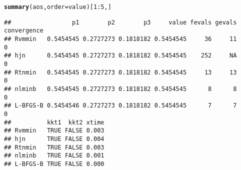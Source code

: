 \documentclass[11pt]{article}\usepackage[]{graphicx}\usepackage[]{color}
\makeatletter
\newcommand{\hlnum}[1]{\textcolor[rgb]{0.686,0.059,0.569}{#1}}%
\newcommand{\hlopt}[1]{\textcolor[rgb]{0,0,0}{#1}}%
\newcommand{\hlstd}[1]{\textcolor[rgb]{0.345,0.345,0.345}{#1}}%
\newcommand{\hlkwc}[1]{\textcolor[rgb]{0.333,0.667,0.333}{#1}}%
\newcommand{\hlkwd}[1]{\textcolor[rgb]{0.737,0.353,0.396}{\textbf{#1}}}%
\newenvironment{kframe}{%
 \def\at@end@of@kframe{}%
 \ifinner\ifhmode%
  \def\at@end@of@kframe{\end{minipage}}%
  \begin{minipage}{\columnwidth}%
 \fi\fi%
 \def\FrameCommand##1{\hskip\@totalleftmargin \hskip-\fboxsep
 \colorbox{shadecolor}{##1}\hskip-\fboxsep
     \hskip-\linewidth \hskip-\@totalleftmargin \hskip\columnwidth}%
 \MakeFramed {\advance\hsize-\width
   \@totalleftmargin\z@ \linewidth\hsize
   \@setminipage}}%
 {\par\unskip\endMakeFramed%
 \at@end@of@kframe}
\newenvironment{knitrout}{}{} %
\makeatother
\begin{document}
\begin{knitrout}
\begin{kframe}
\begin{alltt}
\hlkwd{summary}\hlstd{(aos,}\hlkwc{order}\hlstd{=value)[}\hlnum{1}\hlopt{:}\hlnum{5}\hlstd{,]}
\end{alltt}
\begin{verbatim}
##                 p1        p2        p3     value fevals gevals convergence
## Rvmmin   0.5454545 0.2727273 0.1818182 0.5454545     36     11           0
## hjn      0.5454545 0.2727273 0.1818182 0.5454545    252     NA           0
## Rtnmin   0.5454545 0.2727273 0.1818182 0.5454545     13     13           0
## nlminb   0.5454545 0.2727273 0.1818182 0.5454545      8      8           0
## L-BFGS-B 0.5454546 0.2727273 0.1818182 0.5454545      7      7           0
##          kkt1  kkt2 xtime
## Rvmmin   TRUE FALSE 0.003
## hjn      TRUE FALSE 0.004
## Rtnmin   TRUE FALSE 0.003
## nlminb   TRUE FALSE 0.001
## L-BFGS-B TRUE FALSE 0.000
\end{verbatim}
\end{kframe}
\end{knitrout}
\end{document}
